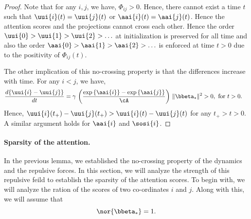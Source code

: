 \documentclass{article}
\theoremstyle{plain}
\theoremstyle{definition}
\theoremstyle{remark}
\begin{document}
\begin{proof}
    Note that for any $i,j$, we have, $\Phi_{ij} > 0$. Hence, there cannot exist a time $t$ such that $\uui{i}(t) = \uui{j}(t)$ or $\aai{i}(t) = \aai{j}(t)$. Hence the attention scores and the projections cannot cross each other. Hence the order  $\uui{0} > \uui{1} > \uui{2} > \ldots $ at initialization is preserved for all time and also the order $\aai{0} > \aai{1} > \aai{2} > \ldots $ is enforced at time $t > 0$ due to the positivity of $\Phi_{ij}(t)$.
   
The other implication of this no-crossing property is that the differences increase with time. 
For any $i < j$, we have,
\begin{align*}
\frac{ d \{ \uui{i} - \uui{j} \} }{ d t} &=  \gamma \, \left( \frac{\exp{\{\aai{i}\}} - \exp{\{\aai{j}\}}}{\cA} \right) \, \| \bbeta_* \|^2 > 0, \text{ for } t > 0. 
\end{align*}
Hence, $\uui{i} (t_+) - \uui{j} (t_+) > \uui{i} (t) - \uui{j} (t) $ for any $t_+ > t > 0$. A similar argument holds for $\aai{i}$ and $\sosi{i}$.
\end{proof}


\paragraph{Sparsity of the attention.} In the previous lemma, we established the no-crossing property of the dynamics and the repulsive forces. In this section, we will analyze the strength of this repulsive feild to establish the sparsity of the attention scores. To begin with, we will analyze the ration of the scores of two co-ordinates $i$ and $j$. Along with this, we will assume that $$\nor{\bbeta_*} = 1.$$ 
\end{document}
